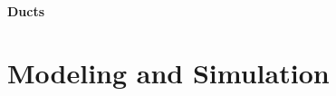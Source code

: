\documentclass[oneside,a4paper,11pt]{report}
\begin{document}
\subsection{Ducts}

\part{Modeling and Simulation}														             %

%
\end{document}
